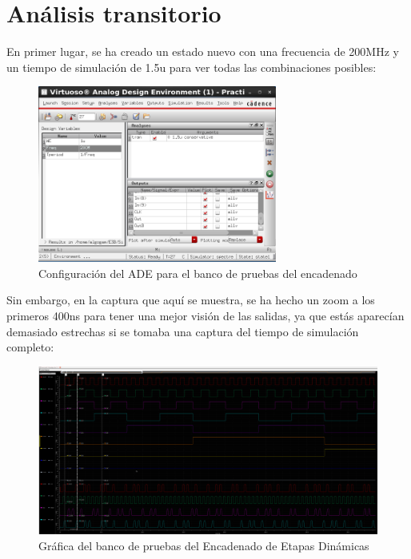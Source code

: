 \section{Análisis transitorio}
\par En primer lugar, se ha creado un estado nuevo con una frecuencia de 200MHz y un tiempo de simulación de 1.5u para ver todas las combinaciones posibles:
\begin{figure}[h]%
\begin {center}
\includegraphics[width=0.7\textwidth]{figures/StateEncConfig.PNG}
\caption{Configuración del ADE para el banco de pruebas del encadenado}
\label{fig:ConfigTBEnc}
\end {center}
\end{figure} \newline
Sin embargo, en la captura que aquí se muestra, se ha hecho un zoom a los primeros 400ns para tener una mejor visión de las salidas, ya que estás aparecían demasiado estrechas si se tomaba una captura del tiempo de simulación completo:
\begin{figure}[H]%
\begin {center}
\includegraphics[width=1\textwidth]{figures/GraphEncTB.png}
\caption{Gráfica del banco de pruebas del Encadenado de Etapas Dinámicas}
\label{fig:GraphTBEnc}
\end {center}
\end{figure}
